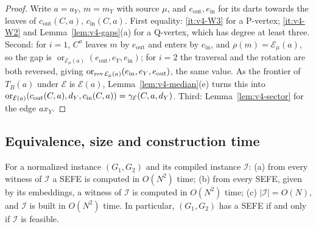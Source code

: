 \begin{proof}
Write $a=a_Y$, $m=m_Y$ with source $\mu$, and $e_{\mathrm{out}},
e_{\mathrm{in}}$ for its darts towards the leaves of $c_{\mathrm{out}}(C,a)$,
$c_{\mathrm{in}}(C,a)$. First equality: \ref{it:v4-W3} for a P-vertex;
\ref{it:v4-W2} and Lemma~\ref{lem:v4-gaps}(a) for a Q-vertex, which has
degree at least three. Second: for $i=1$, $C^a$ leaves $m$ by
$e_{\mathrm{out}}$ and enters by $e_{\mathrm{in}}$, and $\rho(m)=\mathcal
E_\mu(a)$, so the gap is $\operatorname{or}_{\mathcal E_\mu(a)}
(e_{\mathrm{out}},e_Y,e_{\mathrm{in}})$; for $i=2$ the traversal and the
rotation are both reversed, giving $\operatorname{or}_{\operatorname{rev}\mathcal E_\mu(a)}
(e_{\mathrm{in}},e_Y,e_{\mathrm{out}})$, the same value. As the frontier of
$T_B(a)$ under $\mathcal E$ is $\mathcal E(a)$, Lemma~\ref{lem:v4-median}(e)
turns this into $\operatorname{or}_{\mathcal E(a)}(c_{\mathrm{out}}(C,a),d_Y,
c_{\mathrm{in}}(C,a))=\gamma_{\mathcal E}(C,a,d_Y)$. Third: Lemma~\ref{lem:v4-sector} for the edge $ax_Y$.
\end{proof}

\subsection{Equivalence, size and construction time}\label{sec:v4-cmp-equiv}

\begin{theorem}[compilation]\label{thm:v4-compile}
For a normalized instance $(G_1,G_2)$ and its compiled instance $\mathcal I$:
(a) from every witness of $\mathcal I$ a SEFE is computed in $O(N^2)$ time;
(b) from every SEFE, given by its embeddings, a witness of $\mathcal I$ is
computed in $O(N^2)$ time; (c) $|\mathcal I|=O(N)$, and $\mathcal I$ is
built in $O(N^2)$ time. In particular, $(G_1,G_2)$ has a SEFE if and only if
$\mathcal I$ is feasible.
\end{theorem}

